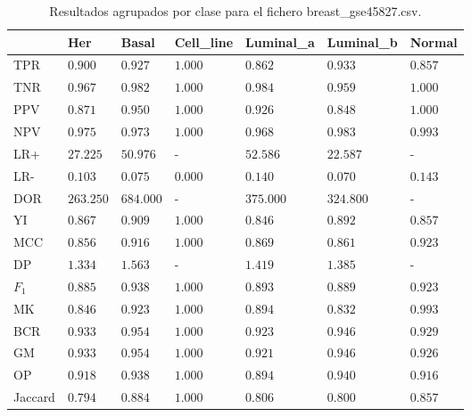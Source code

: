 \begin{table}[htp]
    \small
    \centering
    \begin{tabularx}{\columnwidth}{l Y Y Y Y Y Y}
                &  Her          & Basal     & Cell\_line & Luminal\_a & Luminal\_b & Normal    \\\hline
        TPR     &  $0.900$      & $0.927$   & $1.000$    & $0.862$    & $0.933$    & $0.857$   \\\hline
        TNR     &  $0.967$      & $0.982$   & $1.000$    & $0.984$    & $0.959$    & $1.000$   \\\hline
        PPV     &  $0.871$      & $0.950$   & $1.000$    & $0.926$    & $0.848$    & $1.000$   \\\hline
        NPV     &  $0.975$      & $0.973$   & $1.000$    & $0.968$    & $0.983$    & $0.993$   \\\hline
        LR+     &  $27.225$     & $50.976$  & -          & $52.586$   & $22.587$   & -         \\\hline
        LR-     &  $0.103$      & $0.075$   & $0.000$    & $0.140$    & $0.070$    & $0.143$   \\\hline
        DOR     &  $263.250$    & $684.000$ & -          & $375.000$  & $324.800$  & -         \\\hline
        YI      &  $0.867$      & $0.909$   & $1.000$    & $0.846$    & $0.892$    & $0.857$   \\\hline
        MCC     &  $0.856$      & $0.916$   & $1.000$    & $0.869$    & $0.861$    & $0.923$   \\\hline
        DP      &  $1.334$      & $1.563$   & -          & $1.419$    & $1.385$    & -         \\\hline
        $F_{1}$ &  $0.885$      & $0.938$   & $1.000$    & $0.893$    & $0.889$    & $0.923$   \\\hline
        MK      &  $0.846$      & $0.923$   & $1.000$    & $0.894$    & $0.832$    & $0.993$   \\\hline
        BCR     &  $0.933$      & $0.954$   & $1.000$    & $0.923$    & $0.946$    & $0.929$   \\\hline
        GM      &  $0.933$      & $0.954$   & $1.000$    & $0.921$    & $0.946$    & $0.926$   \\\hline
        OP      &  $0.918$      & $0.938$   & $1.000$    & $0.894$    & $0.940$    & $0.916$   \\\hline
        Jaccard &  $0.794$      & $0.884$   & $1.000$    & $0.806$    & $0.800$    & $0.857$   \\\hline
    \end{tabularx}
    \caption{Resultados agrupados por clase para el fichero breast\_gse45827.csv.}
    \label{tab:13}
\end{table}


